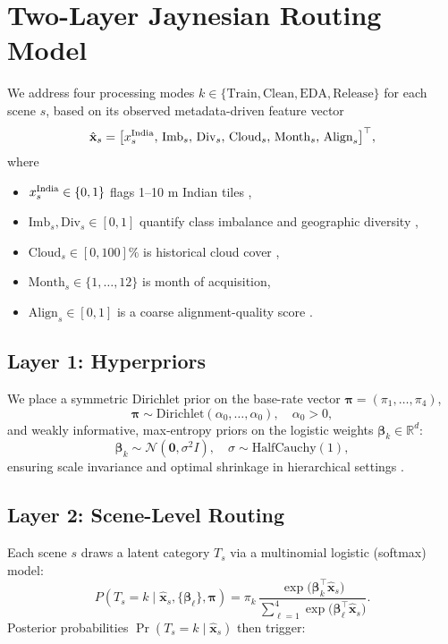 \documentclass{article}
\author{Dhruv Gupta | ARCNet}
\begin{document}
\maketitle
\section*{Two-Layer Jaynesian Routing Model}

We address four processing modes \(k\in\{\mathrm{Train},\mathrm{Clean},\mathrm{EDA},\mathrm{Release}\}\) for each scene \(s\), based on its observed metadata-driven feature vector
\[
\hat{\mathbf x}_s
=
\bigl[
x_s^{\rm India},\,
\mathrm{Imb}_s,\,\mathrm{Div}_s,\,\mathrm{Cloud}_s,\,\mathrm{Month}_s,\,\mathrm{Align}_s
\bigr]^\top,
\]
where
\begin{itemize}
  \item \(x_s^{\rm India}\in\{0,1\}\) flags 1–10 m Indian tiles \citep{BigEarthNet2019},
  \item \(\mathrm{Imb}_s,\mathrm{Div}_s\in[0,1]\) quantify class imbalance and geographic diversity \citep{Demir2025},
  \item \(\mathrm{Cloud}_s\in[0,100]\%\) is historical cloud cover \citep{Cumulo2019},
  \item \(\mathrm{Month}_s\in\{1,\ldots,12\}\) is month of acquisition,
  \item \(\mathrm{Align}_s\in[0,1]\) is a coarse alignment-quality score \citep{ESSD2023}.
\end{itemize}



\subsection*{Layer 1: Hyperpriors}
We place a symmetric Dirichlet prior on the base-rate vector \(\bm\pi=(\pi_1,\dots,\pi_4)\),
\[
\bm\pi \sim \mathrm{Dirichlet}(\alpha_0,\dots,\alpha_0),
\quad \alpha_0>0,
\]
and weakly informative, max‐entropy priors on the logistic weights \(\bm\beta_k\in\mathbb R^d\):
\[
\bm\beta_k \sim \mathcal N(\mathbf0,\sigma^2 I),
\quad
\sigma \sim \mathrm{HalfCauchy}(1),
\]
ensuring scale invariance and optimal shrinkage in hierarchical settings \citep{Gelman2006,PolsonScott2012,McCullaghNelder1998}.

\subsection*{Layer 2: Scene-Level Routing}
Each scene \(s\) draws a latent category \(T_s\) via a multinomial logistic (softmax) model:
\[
P(T_s = k \mid \hat{\mathbf x}_s,\{\bm\beta_\ell\},\bm\pi)
= \pi_k
  \,\frac{\exp\!\bigl(\bm\beta_k^\top \hat{\mathbf x}_s\bigr)}
         {\sum_{\ell=1}^4 \exp\!\bigl(\bm\beta_\ell^\top \hat{\mathbf x}_s\bigr)}.
\]
Posterior probabilities \(\Pr(T_s=k\mid \hat{\mathbf x}_s)\) then trigger:
\end{document}
